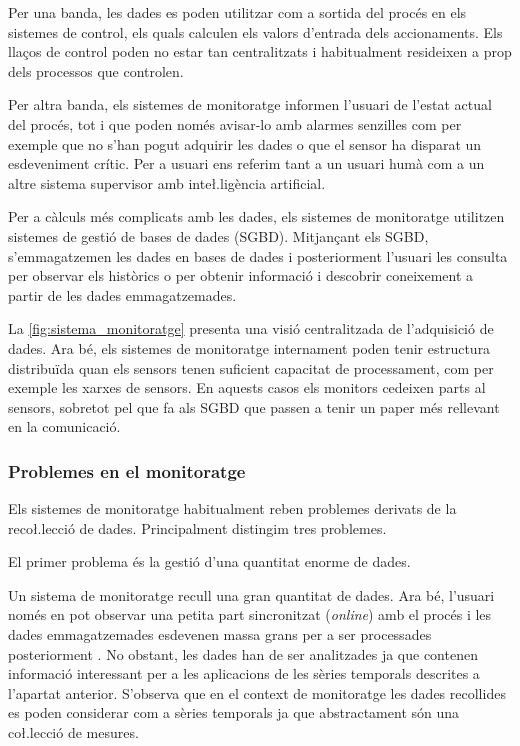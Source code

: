 Per una banda, les dades es poden utilitzar com a sortida del procés en els sistemes de control, els quals calculen els valors d'entrada dels accionaments.
Els llaços de control poden no estar tan centralitzats i habitualment resideixen a prop dels processos que controlen.

Per altra banda, els sistemes de monitoratge informen l'usuari de l'estat actual del procés, tot i que poden només avisar-lo amb alarmes senzilles com per exemple que no s'han pogut adquirir les dades o que el sensor ha disparat un esdeveniment crític. Per a usuari ens referim tant a un usuari humà com a un altre sistema supervisor amb inte\l.ligència artificial. 

Per a càlculs més complicats amb les dades, els sistemes de monitoratge utilitzen sistemes de gestió de bases de dades (SGBD). Mitjançant els SGBD, s'emmagatzemen les dades en bases de dades i posteriorment l'usuari les consulta per observar els històrics o per obtenir informació i descobrir coneixement a partir de les dades emmagatzemades. 

La \autoref{fig:sistema_monitoratge} presenta una visió centralitzada de l'adquisició de dades. Ara bé, els sistemes de monitoratge internament poden tenir estructura distribuïda quan els sensors tenen suficient capacitat de processament, com per exemple les xarxes de sensors. En aquests casos els monitors cedeixen parts al sensors, sobretot pel que fa als SGBD que passen a tenir un paper més rellevant en la comunicació.  







\subsubsection{Problemes en el monitoratge}

Els sistemes de monitoratge habitualment reben problemes derivats de la reco\l.lecció de dades. Principalment distingim tres problemes.

El primer problema és la gestió d'una quantitat enorme de dades. 

Un sistema de monitoratge recull una gran quantitat de dades. Ara bé, l'usuari només en pot observar una petita part sincronitzat (\emph{online}) amb el procés i les dades emmagatzemades esdevenen massa grans per a ser processades posteriorment \parencite{keogh97}. No obstant, les dades han de ser analitzades ja que contenen informació interessant per a les aplicacions de les sèries temporals descrites a l'apartat anterior. S'observa que en el context de monitoratge les dades recollides es poden considerar com a sèries temporals ja que abstractament són una co\l.lecció de mesures.


